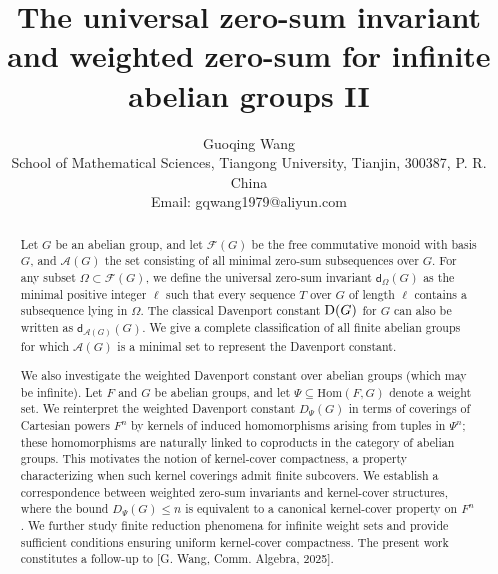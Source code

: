 \documentclass[a4paper, 12pt]{article}
\begin{document}
\title{{The universal zero-sum invariant and weighted zero-sum for infinite abelian groups II}}
\author{
Guoqing Wang\\
\small{School of
Mathematical Sciences, Tiangong University, Tianjin, 300387, P. R. China}\\
\small{Email: gqwang1979@aliyun.com}
\\
}
\date{}
\maketitle

\begin{abstract}
Let $G$ be an abelian group, and let $\mathcal F (G)$ be the free
commutative monoid with basis $G$, and $\mathcal A (G)$ the set consisting of all minimal zero-sum subsequences over $G$. For any subset $\Omega \subset \mathcal F (G)$, we define the universal zero-sum invariant ${\mathsf d}_{\Omega}(G)$ as the minimal positive integer $\ell$ such that
every sequence $T$ over $G$ of length $\ell$ contains a subsequence lying in $\Omega$.  The classical Davenport constant ${\rm D}(G)$ for $G$ can also be written as ${\mathsf d}_{\mathcal A (G)}(G)$. We give a complete classification of all finite abelian groups for which $\mathcal A(G)$ is a minimal set to represent the Davenport constant.

We also investigate  the weighted Davenport constant over abelian groups (which may be infinite).  Let $F$ and $G$ be abelian groups, and let $\Psi \subseteq \mathrm{Hom}(F,G)$ denote a weight set.
We reinterpret the weighted Davenport constant $D_{\Psi}(G)$ in terms of coverings of Cartesian powers $F^n$ by kernels of induced homomorphisms arising from tuples in $\Psi^n$; these homomorphisms are naturally linked to coproducts in the category of abelian groups.
This motivates the notion of kernel-cover compactness, a property characterizing when such kernel coverings admit finite subcovers. We establish a correspondence between weighted zero-sum invariants and kernel-cover structures, where the bound  $D_{\Psi}(G)\le n$ is equivalent to a canonical kernel-cover property on $F^n$.   We further study finite reduction phenomena for infinite weight sets and provide sufficient conditions ensuring uniform kernel-cover compactness.
The present work constitutes a follow-up to [G. Wang, Comm. Algebra, 2025].
\end{abstract}






\end{document}
